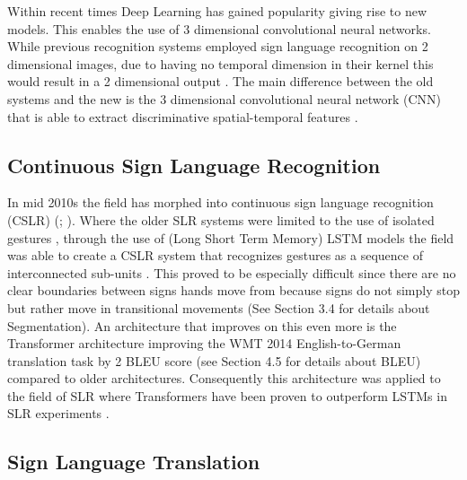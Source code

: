 Within recent times Deep Learning \cite{lecun2015deep} has gained popularity giving rise to new models. This enables the use of 3 dimensional convolutional neural networks. While previous recognition systems employed sign language recognition on 2 dimensional images, due to having no temporal dimension in their kernel this would result in a 2 dimensional output \cite{tran2015learning}. The main difference between the old systems and the new is the 3 dimensional convolutional neural network (CNN) that is able to extract discriminative spatial-temporal features \cite{huang2015sign}.

\subsection{Continuous Sign Language Recognition}

In mid 2010s the field has morphed into continuous sign language recognition (CSLR) (\citealp{koller2015continuous}; \citealp{continuoussignlanguage}). Where the older SLR systems were limited to the use of isolated gestures \cite{cooper2011sign}, through the use of (Long Short Term Memory) LSTM models \cite{hochreiter1997long} the field was able to create a CSLR system that recognizes gestures as a sequence of interconnected sub-units \cite{mittal2019modified}. This proved to be especially difficult since there are no clear boundaries between signs hands move from because signs do not simply stop but rather move in transitional movements (See Section 3.4 for details about Segmentation). An architecture that improves on this even more is the Transformer architecture \cite{vaswani2017attention} improving the WMT 2014 English-to-German translation task by 2 BLEU score (see Section 4.5 for details about BLEU) compared to older architectures. Consequently this architecture was applied to the field of SLR where Transformers have been proven to outperform LSTMs in SLR experiments \cite{de2020sign} \cite{camgoz2020sign}.

\subsection{Sign Language Translation}

